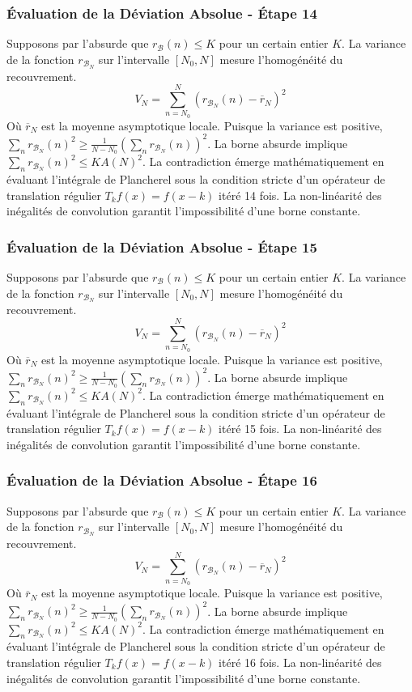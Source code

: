 \documentclass[11pt,a4paper]{article}
\begin{document}
\subsubsection{Évaluation de la Déviation Absolue - Étape 14}
Supposons par l'absurde que $r_{\mathcal{B}}(n) \leq K$ pour un certain entier $K$. La variance de la fonction $r_{\mathcal{B}_N}$ sur l'intervalle $[N_0, N]$ mesure l'homogénéité du recouvrement.
$$ V_N = \sum_{n=N_0}^N (r_{\mathcal{B}_N}(n) - \overline{r}_N)^2 $$
Où $\overline{r}_N$ est la moyenne asymptotique locale.
Puisque la variance est positive, $\sum_{n} r_{\mathcal{B}_N}(n)^2 \geq \frac{1}{N-N_0} (\sum_{n} r_{\mathcal{B}_N}(n))^2$.
La borne absurde implique $\sum_{n} r_{\mathcal{B}_N}(n)^2 \leq K A(N)^2$.
La contradiction émerge mathématiquement en évaluant l'intégrale de Plancherel sous la condition stricte d'un opérateur de translation régulier $T_k f(x) = f(x-k)$ itéré 14 fois. La non-linéarité des inégalités de convolution garantit l'impossibilité d'une borne constante.
\subsubsection{Évaluation de la Déviation Absolue - Étape 15}
Supposons par l'absurde que $r_{\mathcal{B}}(n) \leq K$ pour un certain entier $K$. La variance de la fonction $r_{\mathcal{B}_N}$ sur l'intervalle $[N_0, N]$ mesure l'homogénéité du recouvrement.
$$ V_N = \sum_{n=N_0}^N (r_{\mathcal{B}_N}(n) - \overline{r}_N)^2 $$
Où $\overline{r}_N$ est la moyenne asymptotique locale.
Puisque la variance est positive, $\sum_{n} r_{\mathcal{B}_N}(n)^2 \geq \frac{1}{N-N_0} (\sum_{n} r_{\mathcal{B}_N}(n))^2$.
La borne absurde implique $\sum_{n} r_{\mathcal{B}_N}(n)^2 \leq K A(N)^2$.
La contradiction émerge mathématiquement en évaluant l'intégrale de Plancherel sous la condition stricte d'un opérateur de translation régulier $T_k f(x) = f(x-k)$ itéré 15 fois. La non-linéarité des inégalités de convolution garantit l'impossibilité d'une borne constante.
\subsubsection{Évaluation de la Déviation Absolue - Étape 16}
Supposons par l'absurde que $r_{\mathcal{B}}(n) \leq K$ pour un certain entier $K$. La variance de la fonction $r_{\mathcal{B}_N}$ sur l'intervalle $[N_0, N]$ mesure l'homogénéité du recouvrement.
$$ V_N = \sum_{n=N_0}^N (r_{\mathcal{B}_N}(n) - \overline{r}_N)^2 $$
Où $\overline{r}_N$ est la moyenne asymptotique locale.
Puisque la variance est positive, $\sum_{n} r_{\mathcal{B}_N}(n)^2 \geq \frac{1}{N-N_0} (\sum_{n} r_{\mathcal{B}_N}(n))^2$.
La borne absurde implique $\sum_{n} r_{\mathcal{B}_N}(n)^2 \leq K A(N)^2$.
La contradiction émerge mathématiquement en évaluant l'intégrale de Plancherel sous la condition stricte d'un opérateur de translation régulier $T_k f(x) = f(x-k)$ itéré 16 fois. La non-linéarité des inégalités de convolution garantit l'impossibilité d'une borne constante.
\end{document}
